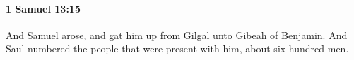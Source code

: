 
		\paragraph{1 Samuel 13:15} %
			\label{1SAMUEL-13-15}

			And Samuel arose, and gat him up from Gilgal unto Gibeah of Benjamin. And Saul numbered the people that were present with him, about six hundred men.


